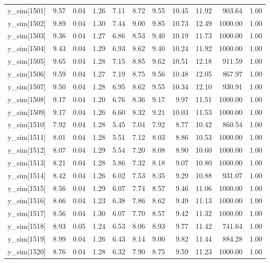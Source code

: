 \begin{table}[ht]
\begin{tabular}{rrrrrrrrrrr}
  y\_sim[1501] & 9.57 & 0.04 & 1.26 & 7.11 & 8.72 & 9.55 & 10.45 & 11.92 & 903.64 & 1.00 \\ 
  y\_sim[1502] & 9.89 & 0.04 & 1.30 & 7.44 & 9.00 & 9.85 & 10.73 & 12.49 & 1000.00 & 1.00 \\ 
  y\_sim[1503] & 9.36 & 0.04 & 1.27 & 6.86 & 8.53 & 9.40 & 10.19 & 11.73 & 1000.00 & 1.00 \\ 
  y\_sim[1504] & 9.43 & 0.04 & 1.29 & 6.93 & 8.62 & 9.40 & 10.24 & 11.92 & 1000.00 & 1.00 \\ 
  y\_sim[1505] & 9.65 & 0.04 & 1.28 & 7.15 & 8.85 & 9.62 & 10.51 & 12.18 & 911.59 & 1.00 \\ 
  y\_sim[1506] & 9.59 & 0.04 & 1.27 & 7.19 & 8.75 & 9.56 & 10.48 & 12.05 & 867.97 & 1.00 \\ 
  y\_sim[1507] & 9.50 & 0.04 & 1.28 & 6.95 & 8.62 & 9.55 & 10.34 & 12.10 & 930.91 & 1.00 \\ 
  y\_sim[1508] & 9.17 & 0.04 & 1.20 & 6.76 & 8.36 & 9.17 & 9.97 & 11.51 & 1000.00 & 1.00 \\ 
  y\_sim[1509] & 9.17 & 0.04 & 1.26 & 6.60 & 8.32 & 9.21 & 10.03 & 11.53 & 1000.00 & 1.00 \\ 
  y\_sim[1510] & 7.92 & 0.04 & 1.28 & 5.45 & 7.04 & 7.92 & 8.77 & 10.42 & 860.54 & 1.00 \\ 
  y\_sim[1511] & 8.01 & 0.04 & 1.28 & 5.51 & 7.12 & 8.03 & 8.86 & 10.53 & 1000.00 & 1.00 \\ 
  y\_sim[1512] & 8.07 & 0.04 & 1.29 & 5.54 & 7.20 & 8.08 & 8.90 & 10.60 & 1000.00 & 1.00 \\ 
  y\_sim[1513] & 8.21 & 0.04 & 1.28 & 5.86 & 7.32 & 8.18 & 9.07 & 10.80 & 1000.00 & 1.00 \\ 
  y\_sim[1514] & 8.42 & 0.04 & 1.26 & 6.02 & 7.53 & 8.35 & 9.29 & 10.88 & 931.07 & 1.00 \\ 
  y\_sim[1515] & 8.56 & 0.04 & 1.29 & 6.07 & 7.74 & 8.57 & 9.46 & 11.06 & 1000.00 & 1.00 \\ 
  y\_sim[1516] & 8.66 & 0.04 & 1.23 & 6.38 & 7.86 & 8.62 & 9.49 & 11.13 & 1000.00 & 1.00 \\ 
  y\_sim[1517] & 8.56 & 0.04 & 1.30 & 6.07 & 7.70 & 8.57 & 9.42 & 11.32 & 1000.00 & 1.00 \\ 
  y\_sim[1518] & 8.93 & 0.05 & 1.24 & 6.53 & 8.06 & 8.93 & 9.77 & 11.42 & 741.64 & 1.00 \\ 
  y\_sim[1519] & 8.99 & 0.04 & 1.26 & 6.43 & 8.14 & 9.00 & 9.82 & 11.44 & 884.28 & 1.00 \\ 
  y\_sim[1520] & 8.76 & 0.04 & 1.28 & 6.32 & 7.90 & 8.75 & 9.59 & 11.23 & 1000.00 & 1.00 \\ 

\end{tabular}
\end{table}
